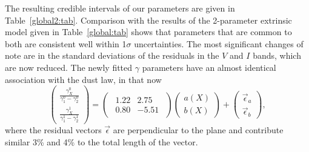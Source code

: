 \documentclass{aastex61}   	%
\begin{document}
The resulting credible intervals of our parameters are given in Table~\ref{global2:tab}.  Comparison with the
results of the 2-parameter extrinsic model given in Table~\ref{global:tab} shows that  parameters that are common to both
are consistent well within 1$\sigma$ uncertainties.  The most significant changes of note are in the standard
deviations of the residuals in the $V$ and $I$ bands, which are now reduced.
The newly fitted $\gamma$ parameters have an almost identical association with the   dust law, in that now
\begin{equation}
\begin{pmatrix}
 \frac{\gamma^0_X}{\gamma^0_1-\gamma^0_2} \\
\frac{\gamma^1_X}{\gamma^1_1-\gamma^1_2} 
\end{pmatrix}=
\begin{pmatrix}
\begin{array}{rr}
1.22 & 2.75 \\
0.80 & -5.51
\end{array}
\end{pmatrix} 
\begin{pmatrix}
a(X) \\
b(X)
\end{pmatrix}+
\begin{pmatrix}
\vec{\epsilon}_a \\
\vec{\epsilon}_b
\end{pmatrix},
\end{equation}
where the residual vectors $\vec{\epsilon}$ are perpendicular to the   plane and
contribute similar 3\% and 4\% to the total  length of the vector.
\end{document}
